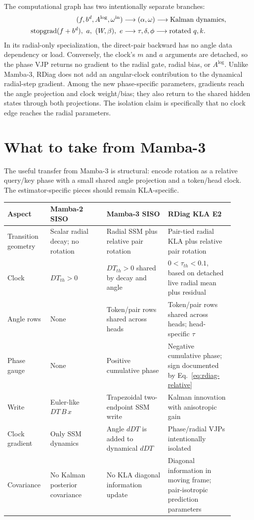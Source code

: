 \documentclass[11pt]{article}
\newcommand{\detach}{\operatorname{stopgrad}}
\begin{document}
The computational graph has two intentionally separate branches:
\begin{align*}
  (f,b^d,A^{\log},\omega^{\rm in})
    &\longrightarrow (\alpha,\omega)\longrightarrow\text{Kalman dynamics},\\
  \detach(f+b^d),\ a,\ (W,\beta),\ e
    &\longrightarrow \tau,\delta,\phi\longrightarrow\text{rotated }q,k.
\end{align*}
In its radial-only specialization, the direct-pair backward has no angle data dependency or load.
Conversely, the clock's $m$ and $a$ arguments are detached, so the phase VJP returns no gradient to
the radial gate, radial bias, or $A^{\log}$.
Unlike Mamba-3, RDiag does not add an angular-clock contribution to the dynamical radial-step
gradient.  Among the new phase-specific parameters, gradients reach the angle projection and clock
weight/bias; they also return to the shared hidden states through both projections.  The isolation
claim is specifically that no clock edge reaches the radial parameters.

\section{What to take from Mamba-3}
\label{sec:takeaways}

The useful transfer from Mamba-3 is structural: encode rotation as a relative query/key phase with
a small shared angle projection and a token/head clock.  The estimator-specific pieces should
remain KLA-specific.

\begin{center}
\small
\begin{tabular}{@{}p{0.16\linewidth}p{0.23\linewidth}p{0.25\linewidth}p{0.27\linewidth}@{}}
\toprule
Aspect & Mamba-2 SISO & Mamba-3 SISO & RDiag KLA E2 \\
\midrule
Transition geometry
  & Scalar radial decay; no rotation
  & Radial SSM plus relative pair rotation
  & Pair-tied radial KLA plus relative pair rotation \\
Clock
  & $DT_{th}>0$
  & $DT_{th}>0$ shared by decay and angle
  & $0<\tau_{th}<0.1$, based on detached live radial mean plus residual \\
Angle rows
  & None
  & Token/pair rows shared across heads
  & Token/pair rows shared across heads; head-specific $\tau$ \\
Phase gauge
  & None
  & Positive cumulative phase
  & Negative cumulative phase; sign documented by Eq.~\eqref{eq:rdiag-relative} \\
Write
  & Euler-like $DT\,B\,x$
  & Trapezoidal two-endpoint SSM write
  & Kalman innovation with anisotropic gain \\
Clock gradient
  & Only SSM dynamics
  & Angle $dDT$ is added to dynamical $dDT$
  & Phase/radial VJPs intentionally isolated \\
Covariance
  & No Kalman posterior covariance
  & No KLA diagonal information update
  & Diagonal information in moving frame; pair-isotropic prediction parameters \\
\bottomrule
\end{tabular}
\end{center}
\end{document}
